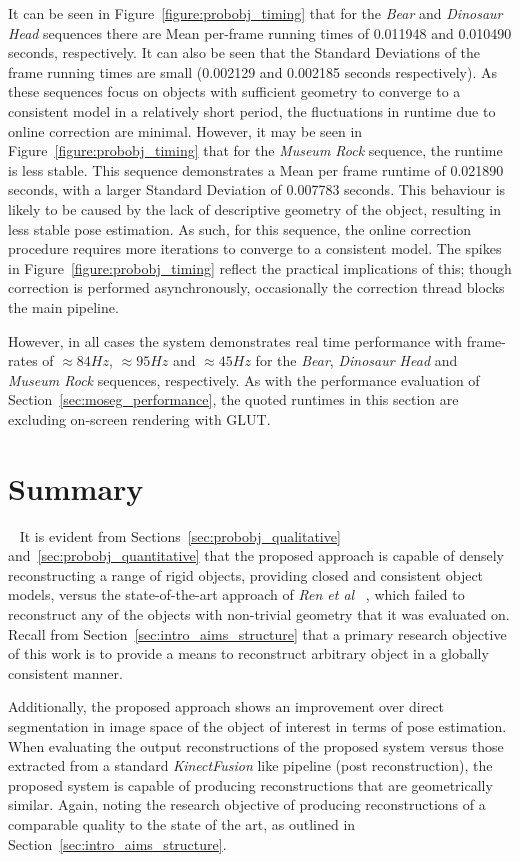 It can be seen in Figure~\ref{figure:probobj_timing} that for the \textit{Bear} and 
\textit{Dinosaur Head} sequences there are Mean per-frame running times of 0.011948 and 
0.010490 seconds, respectively. It can also be seen that the Standard Deviations of the frame 
running times are small (0.002129 and 0.002185 seconds respectively). As these sequences focus on objects 
with sufficient geometry to converge to a consistent model in a relatively short period, the 
fluctuations in runtime due to online correction are minimal. However, it may be seen in 
Figure~\ref{figure:probobj_timing} that for the \textit{Museum Rock} sequence, the runtime is 
less stable. This sequence demonstrates a Mean per frame runtime of 0.021890 seconds, with 
a larger Standard Deviation of 0.007783 seconds. This behaviour is likely to be caused by the lack of 
descriptive geometry of the object, resulting in less stable pose estimation. As such, for this 
sequence, the online correction procedure requires more iterations to converge to a consistent 
model. The spikes in Figure~\ref{figure:probobj_timing} reflect the practical implications of 
this; though correction is performed asynchronously, occasionally the correction thread blocks the 
main pipeline.

However, in all cases the system demonstrates real time performance with frame-rates of 
\( \approx 84Hz \), \( \approx 95Hz \) and \( \approx 45Hz \) for the \textit{Bear}, 
\textit{Dinosaur Head} and \textit{Museum Rock} sequences, respectively. As with the performance 
evaluation of Section~\ref{sec:moseg_performance}, the quoted runtimes in this section are excluding 
on-screen rendering with GLUT\@.

\section{Summary}
~\label{sec:probobj_discussion}
It is evident from Sections~\ref{sec:probobj_qualitative} and~\ref{sec:probobj_quantitative} 
that the proposed approach is capable of densely reconstructing a range of rigid objects, providing 
closed and consistent object models, versus the state-of-the-art approach of \textit{Ren et al} 
~\cite{Ren2013}, which failed to reconstruct any of the objects with non-trivial geometry that it 
was evaluated on. Recall from Section~\ref{sec:intro_aims_structure} that a primary research objective 
of this work is to provide a means to reconstruct arbitrary object in a globally consistent manner.

Additionally, the proposed approach shows an improvement over direct segmentation 
in image space of the object of interest in terms of pose estimation. When evaluating the output 
reconstructions of the proposed system versus those extracted from a standard \textit{KinectFusion} 
like pipeline (post reconstruction), the proposed system is capable of producing reconstructions that 
are geometrically similar. Again, noting the research objective of producing reconstructions of a 
comparable quality to the state of the art, as outlined in Section~\ref{sec:intro_aims_structure}.

